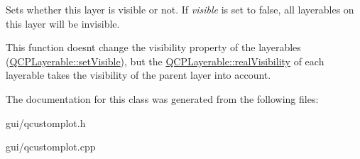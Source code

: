 Sets whether this layer is visible or not. If {\itshape visible} is set to false, all layerables on this layer will be invisible.

This function doesn\textquotesingle{}t change the visibility property of the layerables (\hyperlink{classQCPLayerable_a3bed99ddc396b48ce3ebfdc0418744f8}{Q\+C\+P\+Layerable\+::set\+Visible}), but the \hyperlink{classQCPLayerable_ab054e88f15d485defcb95e7376f119e7}{Q\+C\+P\+Layerable\+::real\+Visibility} of each layerable takes the visibility of the parent layer into account. 

The documentation for this class was generated from the following files\+:\begin{DoxyCompactItemize}
\item 
gui/qcustomplot.\+h\item 
gui/qcustomplot.\+cpp\end{DoxyCompactItemize}
